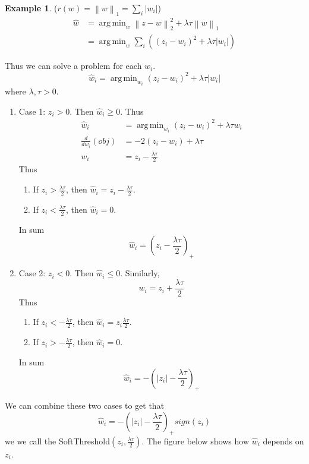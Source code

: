 \documentclass[12pt]{article}
\theoremstyle{definition}
\newtheorem{example}{Example}
\DeclareMathOperator*{\argmin}{arg\,min}
\newcommand{\norm}[1]{\left\lVert#1\right\rVert}
\begin{document}
\begin{example}($r(w) = \norm{w}_1 = \sum_{i} |w_i|$)
\begin{align*}
	\hat w &= \argmin_w \norm{z - w}^2_2 + \lambda \tau \norm{w}_1 \\
	&= \argmin_w \sum_i \left((z_i - w_i)^2 + \lambda \tau |w_i| \right) \tag{separable}
\end{align*}
\end{example}
Thus we can solve a problem for each $w_i$. 
\begin{equation}
	\hat w_i = \argmin_{w_i} (z_i - w_i)^2 + \lambda \tau |w_i|
\end{equation}
where $\lambda,\tau > 0$.
\begin{enumerate}
	\item Case 1: $z_i > 0$. Then $\hat w_i \geq 0$. Thus
	\begin{align*}
		\hat w_i &= \argmin_{w_i} (z_i - w_i)^2 + \lambda \tau w_i \\
		\frac{d}{dw_i}(obj)&= -2(z_i - w_i) + \lambda\tau\\
		w_i &= z_i - \frac{\lambda\tau}{2} 
	\end{align*}
	Thus
	\begin{enumerate}
		\item If $z_i >\frac{\lambda\tau}{2}$, then $\hat w_i = z_i - \frac{\lambda\tau}{2}$.
		\item If $z_i <\frac{\lambda\tau}{2}$, then $\hat w_i = 0$.
	\end{enumerate}
	In sum
	\begin{equation}
		\hat w_i = \left(z_i - \frac{\lambda\tau}{2}\right)_+
	\end{equation}
	\item Case 2: $z_i < 0$. Then $\hat w_i \leq 0$. Similarly,
	\begin{equation}
		w_i = z_i + \frac{\lambda\tau}{2}
	\end{equation}
	Thus
	\begin{enumerate}
		\item If $z_i <-\frac{\lambda\tau}{2}$, then $\hat w_i = z_i \frac{\lambda\tau}{2}$.
		\item If $z_i >-\frac{\lambda\tau}{2}$, then $\hat w_i = 0$.
	\end{enumerate}
	In sum
	\begin{equation}
		\hat w_i = - \left(|z_i| - \frac{\lambda\tau}{2}\right)_+
	\end{equation}
\end{enumerate}
We can combine these two cases to get that
\begin{equation}
	\hat w_i = - \left(|z_i| - \frac{\lambda\tau}{2}\right)_+ sign(z_i)
\end{equation}
we we call the SoftThreshold$(z_i,\frac{\lambda\tau}{2})$. The figure below shows how $\hat w_i$ depends on $z_i$. 
\end{document}
